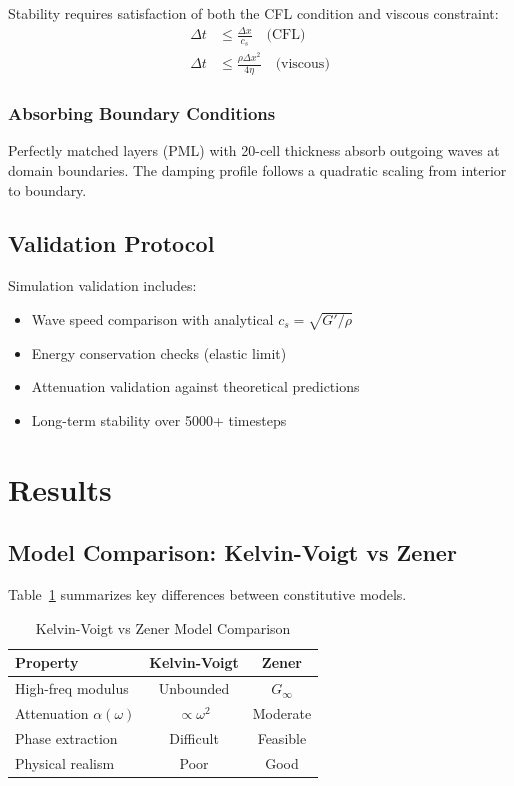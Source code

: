 \documentclass[journal,twoside,a4paper]{IEEEtran}
\begin{document}
Stability requires satisfaction of both the CFL condition and viscous 
constraint:
\begin{align}
    \Delta t &\leq \frac{\Delta x}{c_s} \quad \text{(CFL)} \\
    \Delta t &\leq \frac{\rho \Delta x^2}{4\eta} \quad \text{(viscous)}
\end{align}

\subsubsection{Absorbing Boundary Conditions}

Perfectly matched layers (PML) with 20-cell thickness absorb outgoing 
waves at domain boundaries. The damping profile follows a quadratic 
scaling from interior to boundary.

\subsection{Validation Protocol}

Simulation validation includes:
\begin{itemize}
    \item Wave speed comparison with analytical $c_s = \sqrt{G'/\rho}$
    \item Energy conservation checks (elastic limit)
    \item Attenuation validation against theoretical predictions
    \item Long-term stability over 5000+ timesteps
\end{itemize}

\section{Results}
\label{sec:results}

\subsection{Model Comparison: Kelvin-Voigt vs Zener}

Table~\ref{tab:model_comparison} summarizes key differences between 
constitutive models.

\begin{table}[!t]
\caption{Kelvin-Voigt vs Zener Model Comparison}
\label{tab:model_comparison}
\centering
\begin{tabular}{lcc}
\toprule
\textbf{Property} & \textbf{Kelvin-Voigt} & \textbf{Zener} \\
\midrule
High-freq modulus & Unbounded & $G_\infty$ \\
Attenuation $\alpha(\omega)$ & $\propto \omega^2$ & Moderate \\
Phase extraction & Difficult & Feasible \\
Physical realism & Poor & Good \\
\bottomrule
\end{tabular}
\end{table}
\end{document}
